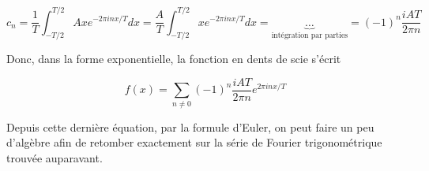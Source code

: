 \begin{equation*}
    c_n = \frac{1}{T}\int_{-T/2}^{T/2}Axe^{-2\pi inx/T}dx = \frac{A}{T}\int_{-T/2}^{T/2}xe^{-2\pi inx/T}dx = \underbrace{\dots}_\text{intégration par parties} = (-1)^n\frac{iAT}{2\pi n}
\end{equation*} 


Donc, dans la forme exponentielle, la fonction en dents de scie s'écrit 

\begin{equation*}
    f(x) = \sum_{n \neq 0}^{}(-1)^n\frac{iAT}{2\pi n}e^{2\pi inx/T}
\end{equation*}

Depuis cette dernière équation, par la formule d'Euler, on peut faire un peu d'algèbre afin de retomber exactement sur la série de Fourier trigonométrique trouvée auparavant. 



